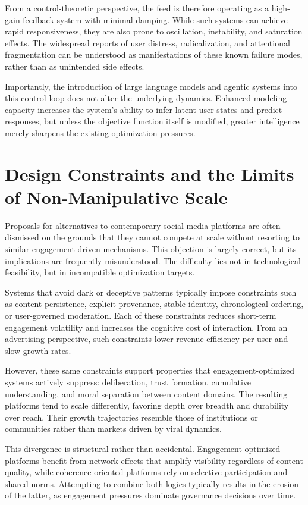 \documentclass[12pt]{article}
\begin{document}
From a control-theoretic perspective, the feed is therefore operating as a high-gain feedback system with minimal damping. While such systems can achieve rapid responsiveness, they are also prone to oscillation, instability, and saturation effects. The widespread reports of user distress, radicalization, and attentional fragmentation can be understood as manifestations of these known failure modes, rather than as unintended side effects.

Importantly, the introduction of large language models and agentic systems into this control loop does not alter the underlying dynamics. Enhanced modeling capacity increases the system's ability to infer latent user states and predict responses, but unless the objective function itself is modified, greater intelligence merely sharpens the existing optimization pressures.

\section{Design Constraints and the Limits of Non-Manipulative Scale}

Proposals for alternatives to contemporary social media platforms are often dismissed on the grounds that they cannot compete at scale without resorting to similar engagement-driven mechanisms. This objection is largely correct, but its implications are frequently misunderstood. The difficulty lies not in technological feasibility, but in incompatible optimization targets.

Systems that avoid dark or deceptive patterns typically impose constraints such as content persistence, explicit provenance, stable identity, chronological ordering, or user-governed moderation. Each of these constraints reduces short-term engagement volatility and increases the cognitive cost of interaction. From an advertising perspective, such constraints lower revenue efficiency per user and slow growth rates.

However, these same constraints support properties that engagement-optimized systems actively suppress: deliberation, trust formation, cumulative understanding, and moral separation between content domains. The resulting platforms tend to scale differently, favoring depth over breadth and durability over reach. Their growth trajectories resemble those of institutions or communities rather than markets driven by viral dynamics.

This divergence is structural rather than accidental. Engagement-optimized platforms benefit from network effects that amplify visibility regardless of content quality, while coherence-oriented platforms rely on selective participation and shared norms. Attempting to combine both logics typically results in the erosion of the latter, as engagement pressures dominate governance decisions over time.
\end{document}
